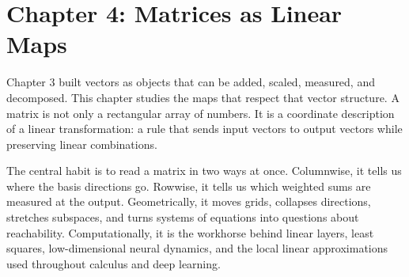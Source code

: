 \section{Chapter 4: Matrices as Linear Maps}
\label{ch:matrices-linear-maps}

Chapter 3 built vectors as objects that can be added, scaled, measured, and decomposed. This chapter studies the maps that respect that vector structure. A matrix is not only a rectangular array of numbers. It is a coordinate description of a linear transformation: a rule that sends input vectors to output vectors while preserving linear combinations.

The central habit is to read a matrix in two ways at once. Columnwise, it tells us where the basis directions go. Rowwise, it tells us which weighted sums are measured at the output. Geometrically, it moves grids, collapses directions, stretches subspaces, and turns systems of equations into questions about reachability. Computationally, it is the workhorse behind linear layers, least squares, low-dimensional neural dynamics, and the local linear approximations used throughout calculus and deep learning.


